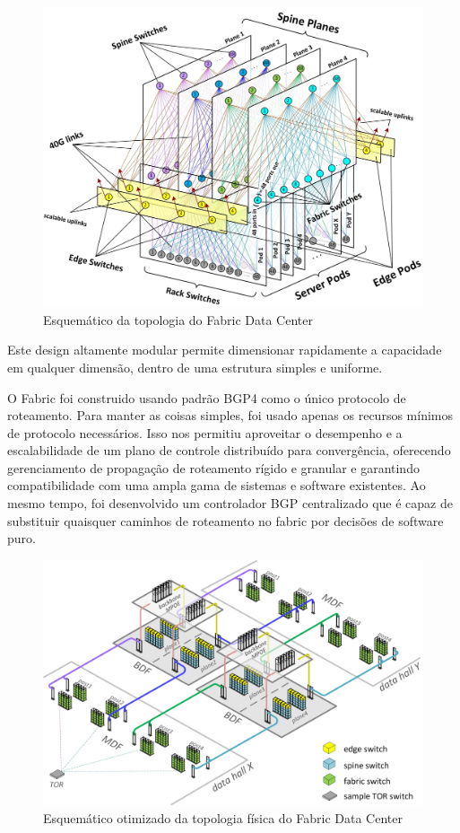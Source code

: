 \documentclass[12pt,a4paper]{report}
\begin{document}
\begin{figure}[H]
\centering
\includegraphics[width=.7\textwidth]{imagens/scheme_fabric.jpg}
\caption{Esquemático da topologia do Fabric Data Center}
\label{face3}
\end{figure}


Este design altamente modular permite dimensionar rapidamente a capacidade em qualquer dimensão, 
dentro de uma estrutura simples e uniforme.


O Fabric foi construido usando padrão BGP4 como o único protocolo de roteamento. 
Para manter as coisas simples, foi usado apenas os recursos mínimos de protocolo necessários. 
Isso nos permitiu aproveitar o desempenho e a escalabilidade de um plano de controle distribuído para convergência, 
oferecendo gerenciamento de propagação de roteamento rígido e granular e garantindo compatibilidade com uma ampla 
gama de sistemas e software existentes. Ao mesmo tempo, foi desenvolvido um controlador BGP centralizado que é capaz de 
substituir quaisquer caminhos de roteamento no fabric por decisões de software puro. 




\begin{figure}[H]
\centering
\includegraphics[width=.7\textwidth]{imagens/phisic_fabric.jpg}
\caption{Esquemático otimizado da topologia física do Fabric Data Center}
\label{face4}
\end{figure}
\end{document}
